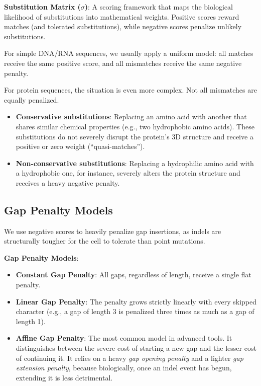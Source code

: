 \begin{important}
    \textbf{Substitution Matrix ($\sigma$)}: A scoring framework that maps the biological likelihood of substitutions into mathematical weights. Positive scores reward matches (and tolerated substitutions), while negative scores penalize unlikely substitutions.
\end{important}

For simple DNA/RNA sequences, we usually apply a uniform model: all matches receive the same positive score, and all mismatches receive the same negative penalty.


For protein sequences, the situation is even more complex. Not all mismatches are equally penalized. 
\begin{itemize}
    \item \textbf{Conservative substitutions}: Replacing an amino acid with another that shares similar chemical properties (e.g., two hydrophobic amino acids). These substitutions do not severely disrupt the protein's 3D structure and receive a positive or zero weight (``quasi-matches'').
    \item \textbf{Non-conservative substitutions}: Replacing a hydrophilic amino acid with a hydrophobic one, for instance, severely alters the protein structure and receives a heavy negative penalty.
\end{itemize}

\subsection{Gap Penalty Models}
We use negative scores to heavily penalize gap insertions, as indels are structurally tougher for the cell to tolerate than point mutations.
\begin{important}
    \textbf{Gap Penalty Models}:
    \begin{itemize}
        \item \textbf{Constant Gap Penalty}: All gaps, regardless of length, receive a single flat penalty.
        \item \textbf{Linear Gap Penalty}: The penalty grows strictly linearly with every skipped character (e.g., a gap of length 3 is penalized three times as much as a gap of length 1).
        \item \textbf{Affine Gap Penalty}: The most common model in advanced tools. It distinguishes between the severe cost of starting a new gap and the lesser cost of continuing it. It relies on a heavy \textit{gap opening penalty} and a lighter \textit{gap extension penalty}, because biologically, once an indel event has begun, extending it is less detrimental.
    \end{itemize}
\end{important}

